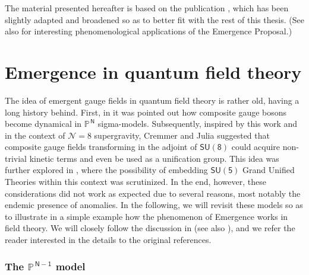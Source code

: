 The material presented hereafter is based on the publication \cite{Castellano:2022bvr}, which has been slightly adapted and broadened so as to better fit with the rest of this thesis. (See also \cite{Castellano:2023qhp} for interesting phenomenological applications of the Emergence Proposal.)

\section{Emergence in quantum field theory}
\label{s:CPNEmergence}

The idea of emergent gauge fields in quantum field theory is rather old, having a long history behind. First, in \cite{DAdda:1978vbw} it was pointed out how composite gauge bosons become dynamical in $\mathbb{P}^{\,\mathsf{N}}$ sigma-models. Subsequently, inspired by this work and in the context of $\mathcal{N}=8$ supergravity, Cremmer and Julia \cite{Cremmer:1979up} suggested that composite gauge fields transforming in the adjoint of $\mathsf{SU(8)}$ could acquire non-trivial kinetic terms and even be used as a unification group. This idea was further explored in \cite{Ellis:1980cf,Ellis:1980tf}, where the possibility of embedding $\mathsf{SU(5)}$ Grand Unified Theories within this context was scrutinized. In the end, however, these considerations did not work as expected due to several reasons, most notably the endemic presence of anomalies. In the following, we will revisit these models so as to illustrate in a simple example how the phenomenon of Emergence works in field theory. We will closely follow the discussion in \cite{Palti:2019pca} (see also \cite{Rabinovici:2011jj,Milekhin:2012ca,Witten:1978bc,Gross:1974jv}), and we refer the reader interested in the details to the original references.

\subsubsection*{The $\mathbb{P}^{\,\mathsf{N-1}}$ model}

